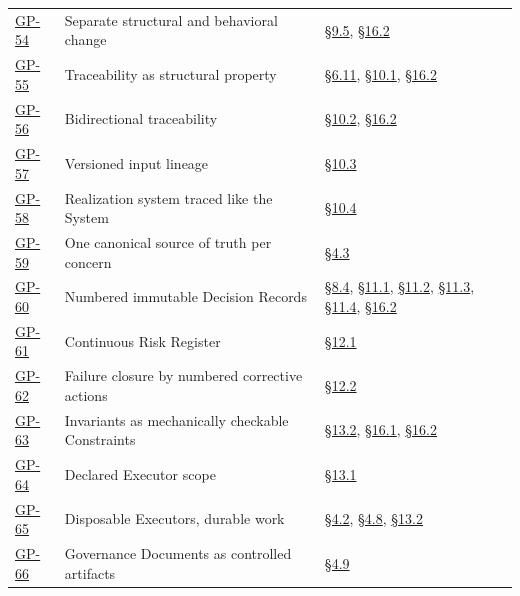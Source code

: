 \begin{longtable}{@{}p{} p{} p{}@{}}
\hyperlink{gp-54}{GP-54} & Separate structural and behavioral change & \hyperlink{nss-9.5}{\S9.5}, \hyperlink{nss-16.2}{\S16.2} \\

\hyperlink{gp-55}{GP-55} & Traceability as structural property & \hyperlink{nss-6.11}{\S6.11}, \hyperlink{nss-10.1}{\S10.1}, \hyperlink{nss-16.2}{\S16.2} \\

\hyperlink{gp-56}{GP-56} & Bidirectional traceability & \hyperlink{nss-10.2}{\S10.2}, \hyperlink{nss-16.2}{\S16.2} \\

\hyperlink{gp-57}{GP-57} & Versioned input lineage & \hyperlink{nss-10.3}{\S10.3} \\

\hyperlink{gp-58}{GP-58} & Realization system traced like the System & \hyperlink{nss-10.4}{\S10.4} \\

\hyperlink{gp-59}{GP-59} & One canonical source of truth per concern & \hyperlink{nss-4.3}{\S4.3} \\

\hyperlink{gp-60}{GP-60} & Numbered immutable Decision Records & \hyperlink{nss-8.4}{\S8.4}, \hyperlink{nss-11.1}{\S11.1}, \hyperlink{nss-11.2}{\S11.2}, \hyperlink{nss-11.3}{\S11.3}, \hyperlink{nss-11.4}{\S11.4}, \hyperlink{nss-16.2}{\S16.2} \\

\hyperlink{gp-61}{GP-61} & Continuous Risk Register & \hyperlink{nss-12.1}{\S12.1} \\

\hyperlink{gp-62}{GP-62} & Failure closure by numbered corrective actions & \hyperlink{nss-12.2}{\S12.2} \\

\hyperlink{gp-63}{GP-63} & Invariants as mechanically checkable Constraints & \hyperlink{nss-13.2}{\S13.2}, \hyperlink{nss-16.1}{\S16.1}, \hyperlink{nss-16.2}{\S16.2} \\

\hyperlink{gp-64}{GP-64} & Declared Executor scope & \hyperlink{nss-13.1}{\S13.1} \\

\hyperlink{gp-65}{GP-65} & Disposable Executors, durable work & \hyperlink{nss-4.2}{\S4.2}, \hyperlink{nss-4.8}{\S4.8}, \hyperlink{nss-13.2}{\S13.2} \\

\hyperlink{gp-66}{GP-66} & Governance Documents as controlled artifacts & \hyperlink{nss-4.9}{\S4.9} \\


\end{longtable}
